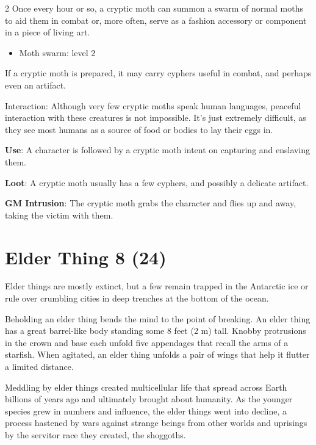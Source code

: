\begin{multicols}{2}
Once every hour or so, a cryptic moth can summon a swarm of normal moths to aid them in combat or, more often, serve as a fashion accessory or component in a piece of living art.

\begin{itemize} 
\item Moth swarm: level 2
\end{itemize}

If a cryptic moth is prepared, it may carry cyphers useful in combat, and perhaps even an artifact.

Interaction: Although very few cryptic moths speak human languages, peaceful interaction with these creatures is not impossible. It’s just extremely difficult, as they see most humans as a source of food or bodies to lay their eggs in.

\textbf{Use}: A character is followed by a cryptic moth intent on capturing and enslaving them. 

\textbf{Loot}: A cryptic moth usually has a few cyphers, and possibly a delicate artifact.

\textbf{GM Intrusion}: The cryptic moth grabs the character and flies up and away, taking the victim with them.

\section{Elder Thing 8 (24)}

Elder things are mostly extinct, but a few remain trapped in the Antarctic ice or rule over crumbling cities in deep trenches at the bottom of the ocean.

Beholding an elder thing bends the mind to the point of breaking. An elder thing has a great barrel-like body standing some 8 feet (2 m) tall. Knobby protrusions in the crown and base each unfold five appendages that recall the arms of a starfish. When agitated, an elder thing unfolds a pair of wings that help it flutter a limited distance.

Meddling by elder things created multicellular life that spread across Earth billions of years ago and ultimately brought about humanity. As the younger species grew in numbers and influence, the elder things went into decline, a process hastened by wars against strange beings from other worlds and uprisings by the servitor race they created, the shoggoths.


\end{multicols}
